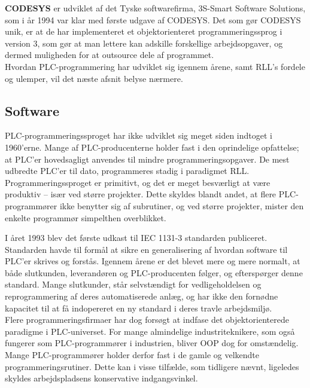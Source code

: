 \noindent\textbf{CODESYS} er udviklet af det Tyske softwarefirma, 3S-Smart Software Solutions, som i år 1994 var klar med første udgave af CODESYS. Det som gør CODESYS unik, er at de har implementeret et objektorienteret programmeringssprog i version 3, som gør at man lettere kan adskille forskellige arbejdsopgaver, og dermed muligheden for at outsource dele af programmet. \\

\noindent Hvordan PLC-programmering har udviklet sig igennem årene, samt RLL's fordele og ulemper, vil det næste afsnit belyse nærmere.

\subsection{Software}
PLC-programmeringssproget har ikke udviklet sig meget siden indtoget i 1960’erne. 
Mange af PLC-producenterne holder fast i den oprindelige opfattelse; at PLC’er hovedsagligt anvendes til mindre programmeringsopgaver. De mest udbredte PLC’er til dato, programmeres stadig i paradigmet RLL. Programmeringssproget er primitivt, og det er meget besværligt at være produktiv – især ved større projekter. Dette skyldes blandt andet, at flere PLC-programmører ikke benytter sig af subrutiner, og ved større projekter, mister den enkelte programmør simpelthen overblikket. 

I året 1993 blev det første udkast til IEC 1131-3 standarden publiceret\cite{iecStandard}. Standarden havde til formål at sikre en generalisering af hvordan software til PLC'er skrives og forstås. Igennem årene er det blevet mere og mere normalt, at både slutkunden, leverandøren og PLC-producenten følger, og efterspørger denne standard. Mange slutkunder, står selvstændigt for vedligeholdelsen og reprogrammering af deres automatiserede anlæg, og har ikke den fornødne kapacitet til at få indopereret en ny standard i deres travle arbejdsmiljø. \\

\noindent Flere programmeringsfirmaer har dog forsøgt at indfase det objektorienterede paradigme i PLC-universet. For mange almindelige industriteknikere, som også fungerer som PLC-programmører i industrien, bliver OOP dog for omstændelig. Mange PLC-programmører holder derfor fast i de gamle og velkendte programmeringsrutiner. Dette kan i visse tilfælde, som tidligere nævnt, ligeledes skyldes arbejdspladsens konservative indgangsvinkel\cite{PLC_Siemens_OOP}.  \\

